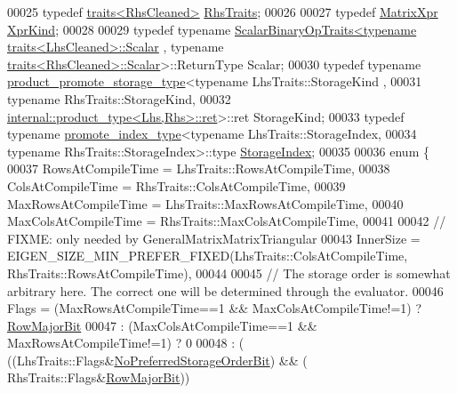 \begin{DoxyCode}
00025   \textcolor{keyword}{typedef} \hyperlink{struct_eigen_1_1internal_1_1traits}{traits<RhsCleaned>} \hyperlink{struct_eigen_1_1internal_1_1traits}{RhsTraits};
00026   
00027   \textcolor{keyword}{typedef} \hyperlink{struct_eigen_1_1_matrix_xpr}{MatrixXpr} \hyperlink{struct_eigen_1_1_matrix_xpr}{XprKind};
00028   
00029   \textcolor{keyword}{typedef} \textcolor{keyword}{typename} \hyperlink{group___core___module_struct_eigen_1_1_scalar_binary_op_traits}{ScalarBinaryOpTraits<typename traits<LhsCleaned>::Scalar}
      , \textcolor{keyword}{typename} \hyperlink{struct_eigen_1_1internal_1_1traits}{traits<RhsCleaned>::Scalar}>::ReturnType Scalar;
00030   \textcolor{keyword}{typedef} \textcolor{keyword}{typename} \hyperlink{struct_eigen_1_1internal_1_1product__promote__storage__type}{product\_promote\_storage\_type}<\textcolor{keyword}{typename} LhsTraits::StorageKind
      ,
00031                                                 \textcolor{keyword}{typename} RhsTraits::StorageKind,
00032                                                 
      \hyperlink{struct_eigen_1_1internal_1_1product__type}{internal::product\_type<Lhs,Rhs>::ret}>::ret StorageKind;
00033   \textcolor{keyword}{typedef} \textcolor{keyword}{typename} \hyperlink{struct_eigen_1_1internal_1_1promote__index__type}{promote\_index\_type}<\textcolor{keyword}{typename} LhsTraits::StorageIndex,
00034                                       \textcolor{keyword}{typename} RhsTraits::StorageIndex>::type 
      \hyperlink{struct_eigen_1_1internal_1_1conditional}{StorageIndex};
00035   
00036   \textcolor{keyword}{enum} \{
00037     RowsAtCompileTime    = LhsTraits::RowsAtCompileTime,
00038     ColsAtCompileTime    = RhsTraits::ColsAtCompileTime,
00039     MaxRowsAtCompileTime = LhsTraits::MaxRowsAtCompileTime,
00040     MaxColsAtCompileTime = RhsTraits::MaxColsAtCompileTime,
00041     
00042     \textcolor{comment}{// FIXME: only needed by GeneralMatrixMatrixTriangular}
00043     InnerSize = EIGEN\_SIZE\_MIN\_PREFER\_FIXED(LhsTraits::ColsAtCompileTime, RhsTraits::RowsAtCompileTime),
00044     
00045     \textcolor{comment}{// The storage order is somewhat arbitrary here. The correct one will be determined through the
       evaluator.}
00046     Flags = (MaxRowsAtCompileTime==1 && MaxColsAtCompileTime!=1) ? \hyperlink{group__flags_gae4f56c2a60bbe4bd2e44c5b19cbe8762}{RowMajorBit}
00047           : (MaxColsAtCompileTime==1 && MaxRowsAtCompileTime!=1) ? 0
00048           : (   ((LhsTraits::Flags&\hyperlink{group__flags_ga3c186ad80ddcf5e2ed3d7ee31cca1860}{NoPreferredStorageOrderBit}) && (
      RhsTraits::Flags&\hyperlink{group__flags_gae4f56c2a60bbe4bd2e44c5b19cbe8762}{RowMajorBit}))

\end{DoxyCode}
